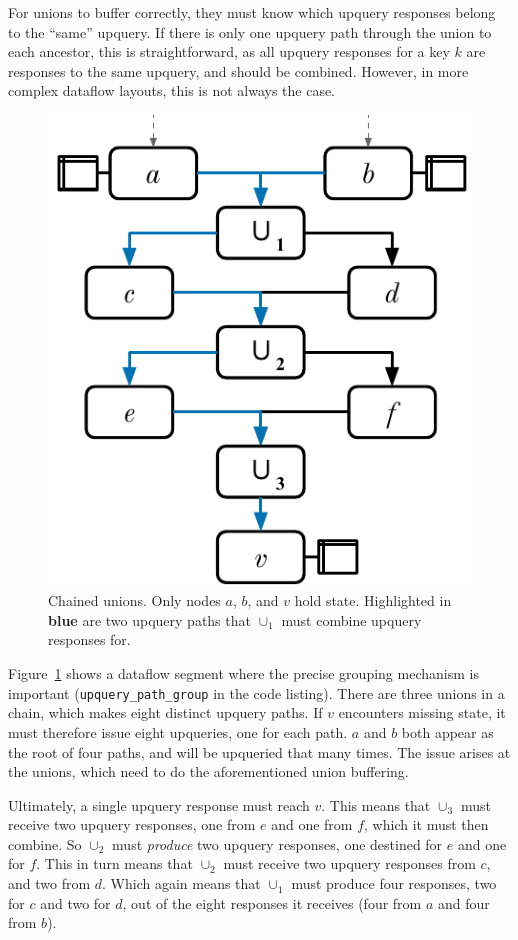 For unions to buffer correctly, they must know which upquery responses belong to
the ``same'' upquery. If there is only one upquery path through the union to
each ancestor, this is straightforward, as all upquery responses for a key $k$
are responses to the same upquery, and should be combined. However, in more
complex dataflow layouts, this is not always the case.

\begin{figure}[t]
  \centering
  \includegraphics{diagrams/Chained Unions.pdf}
  \caption{Chained unions. Only nodes $a$, $b$, and $v$ hold state. Highlighted
  in \textbf{\color{set1}blue} are two upquery paths that $\cup_1$ must combine
  upquery responses for.}
  \label{f:chained-union}
\end{figure}

Figure~\ref{f:chained-union} shows a dataflow segment where the precise grouping
mechanism is important (\texttt{upquery\_path\_group} in the code listing).
There are three unions in a chain, which makes eight distinct upquery paths. If
$v$ encounters missing state, it must therefore issue eight upqueries, one for
each path. $a$ and $b$ both appear as the root of four paths, and will be
upqueried that many times. The issue arises at the unions, which need to do
the aforementioned union buffering.

Ultimately, a single upquery response must reach $v$. This means that $\cup_3$
must receive two upquery responses, one from $e$ and one from $f$, which it must
then combine. So $\cup_2$ must \emph{produce} two upquery responses, one
destined for $e$ and one for $f$. This in turn means that $\cup_2$ must receive
two upquery responses from $c$, and two from $d$. Which again means that
$\cup_1$ must produce four responses, two for $c$ and two for $d$, out of the
eight responses it receives (four from $a$ and four from $b$).


